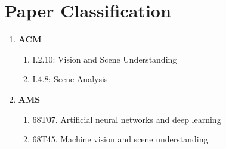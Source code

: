 \documentclass[11pt]{article}
\begin{document}
    \section{Paper Classification}
    \begin{enumerate}
        \item \textbf{ACM}
            \begin{enumerate}
                \item I.2.10:  Vision and Scene Understanding
                \item I.4.8:  Scene Analysis
            \end{enumerate}
        \item \textbf{AMS}
            \begin{enumerate}
                \item 68T07.  Artificial neural networks and deep learning 
                \item 68T45.  Machine vision and scene understanding
            \end{enumerate}
    \end{enumerate}

    
    
\end{document}
